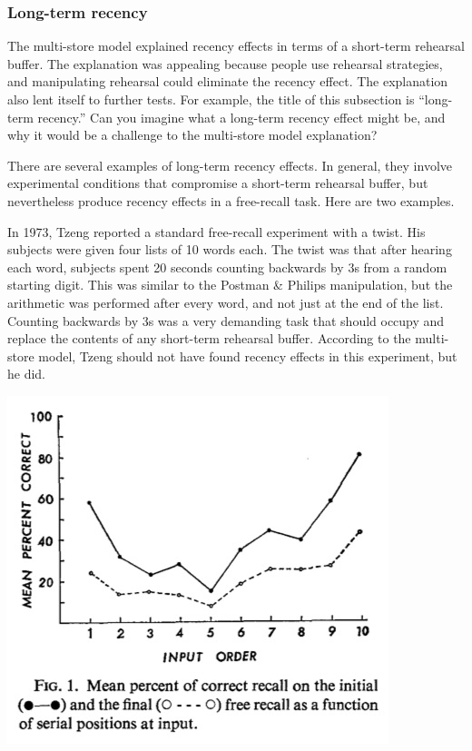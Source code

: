 \documentclass[
  oneside,
  12pt]{crumpbook}
\newenvironment{floatright50}{%
  \wrapfigure{R}{.5\textwidth}%
  }{%
  \endwrapfigure}
\begin{document}
\hypertarget{long-term-recency}{%
\subsubsection{Long-term recency}\label{long-term-recency}}

The multi-store model explained recency effects in terms of a short-term rehearsal buffer. The explanation was appealing because people use rehearsal strategies, and manipulating rehearsal could eliminate the recency effect. The explanation also lent itself to further tests. For example, the title of this subsection is ``long-term recency.'' Can you imagine what a long-term recency effect might be, and why it would be a challenge to the multi-store model explanation?

There are several examples of long-term recency effects. In general, they involve experimental conditions that compromise a short-term rehearsal buffer, but nevertheless produce recency effects in a free-recall task. Here are two examples.

In 1973, Tzeng reported a standard free-recall experiment with a twist. His subjects were given four lists of 10 words each. The twist was that after hearing each word, subjects spent 20 seconds counting backwards by 3s from a random starting digit. This was similar to the Postman \& Philips manipulation, but the arithmetic was performed after every word, and not just at the end of the list. Counting backwards by 3s was a very demanding task that should occupy and replace the contents of any short-term rehearsal buffer. According to the multi-store model, Tzeng should not have found recency effects in this experiment, but he did.

\begin{floatright50}
\includegraphics[width=1\linewidth]{imgs/Tzeng_1973}

\end{floatright50}
\end{document}
